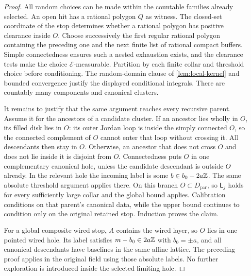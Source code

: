 \begin{proof}
All random choices can be made within the countable families already
selected. An open hit has a rational polygon \(Q\) as witness. The
closed-set coordinate of the stop determines whether a rational polygon
has positive clearance inside \(O\). Choose successively the first
regular rational polygon containing the preceding one and the next
finite list of rational compact buffers. Simple connectedness ensures
such a nested exhaustion exists, and the clearance tests make the choice
\(\mathscr E\)-measurable. Partition by each finite collar and threshold
choice before conditioning. The random-domain clause of
\cref{lem:local-kernel} and bounded convergence justify the displayed
conditional integrals. There are countably many components and
canonical clusters.

It remains to justify that the same argument reaches every recursive
parent. Assume it for the ancestors of a candidate cluster. If an
ancestor lies wholly in \(O\), its filled disk lies in \(O\): its
outer Jordan loop is inside the simply connected \(O\), so the
connected complement of \(O\) cannot enter that loop without crossing
it. All descendants then stay in \(O\). Otherwise, an ancestor that
does not cross \(O\) and does not lie inside it is disjoint from \(O\).
Connectedness puts \(O\) in one complementary canonical hole, unless
the candidate descendant is outside \(O\) already. In the relevant
hole the incoming label is some \(b\in b_0+2a\mathbb Z\). The same absolute
threshold argument applies there. On this branch \(O\subset D_{\mathrm{par}}\),
so \(\mathsf L_j\) holds for every sufficiently large collar and the
global bound applies. Calibration conditions on that
parent's canonical data, while the upper bound continues to condition
only on the original retained stop. Induction proves the claim.

For a global composite wired stop, \(A\) contains the wired layer, so
\(O\) lies in one pointed wired hole. Its label satisfies
\(m-b_0\in2a\mathbb Z\) with \(b_0=\pm a\), and all canonical descendants
have baselines in the same affine lattice. The preceding proof applies
in the original field using those absolute labels. No further
exploration is introduced inside the selected limiting hole.
\end{proof}
